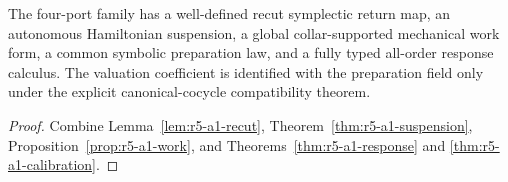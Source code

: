 \begin{theorem}
\label{thm:r5-a1-main}
The four-port family has a well-defined recut symplectic return map, an
autonomous Hamiltonian suspension, a global collar-supported mechanical work
form, a common symbolic preparation law, and a fully typed all-order response
calculus.  The valuation coefficient is identified with the preparation field
only under the explicit canonical-cocycle compatibility theorem.
\end{theorem}

\begin{proof}
Combine Lemma~\ref{lem:r5-a1-recut},
Theorem~\ref{thm:r5-a1-suspension},
Proposition~\ref{prop:r5-a1-work}, and
Theorems~\ref{thm:r5-a1-response} and
\ref{thm:r5-a1-calibration}.
\end{proof}
